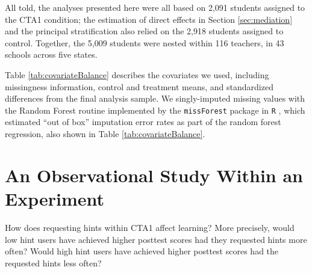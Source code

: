 \documentclass{article}\usepackage[]{graphicx}\usepackage[]{color}
\begin{document}
All told, the analyses presented here were all based on 2,091 students assigned to the CTA1 condition; the estimation of direct effects in Section \ref{sec:mediation} and the principal stratification also relied on the 2,918 students assigned to control.
Together, the 5,009 students were nested within 116 teachers, in 43 schools across five states.


Table \ref{tab:covariateBalance} describes the covariates we used, including
missingness information, control and treatment means, and standardized
differences \citep[c.f.][]{kalton1968standardization} from the final
analysis sample.
We singly-imputed missing values with the Random Forest routine implemented
by the \texttt{missForest} package in \texttt{R}
\citep{missForest,rcite},  which estimated ``out of box'' imputation
error rates as part of the random forest regression, also shown in Table \ref{tab:covariateBalance}.

\begin{table}[ht]
\centering

\caption{Missingness information, control (``BaU'' or ``Business as
  Usual'') and treatment (``CTA1'') means, and balance for the
  covariates included in this study, from the high school year two
  stratum of CTA1 Effectiveness experiment. Imputation error is percent falsely classified for
  categorical variables (Race/Ethnicity, Sex, and Special Education)
  and standardized root mean squared error for Pretest, which is
  continuous. %
  Analysis done in \texttt{R} via \texttt{RItools} \citep{ritools}.}
\label{tab:covariateBalance}
\end{table}


\section{An Observational Study Within an Experiment}\label{sec:observational}

How does requesting hints within CTA1 affect learning?
More precisely, would low hint users have achieved higher posttest scores
had they requested hints more often?
Would high hint users have achieved higher posttest scores had the
requested hints less often?
\end{document}
